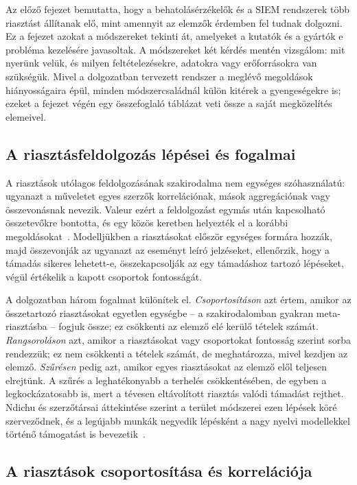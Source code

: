 Az előző fejezet bemutatta, hogy a behatolásérzékelők és a \ac{SIEM} rendszerek több riasztást állítanak elő, mint amennyit az elemzők érdemben fel tudnak dolgozni. Ez a fejezet azokat a módszereket tekinti át, amelyeket a kutatók és a gyártók e probléma kezelésére javasoltak. A módszereket két kérdés mentén vizsgálom: mit nyerünk velük, és milyen feltételezésekre, adatokra vagy erőforrásokra van szükségük. Mivel a dolgozatban tervezett rendszer a meglévő megoldások hiányosságaira épül, minden módszercsaládnál külön kitérek a gyengeségekre is; ezeket a fejezet végén egy összefoglaló táblázat veti össze a saját megközelítés elemeivel.

\subsection{A riasztásfeldolgozás lépései és fogalmai}\label{sec:lepesek}
A riasztások utólagos feldolgozásának szakirodalma nem egységes szóhasználatú: ugyanazt a műveletet egyes szerzők korrelációnak, mások aggregációnak vagy összevonásnak nevezik. Valeur ezért a feldolgozást egymás után kapcsolható összetevőkre bontotta, és egy közös keretben helyezték el a korábbi megoldásokat~\cite{valeur2004}. Modelljükben a riasztásokat először egységes formára hozzák, majd összevonják az ugyanazt az eseményt leíró jelzéseket, ellenőrzik, hogy a támadás sikeres lehetett-e, összekapcsolják az egy támadáshoz tartozó lépéseket, végül értékelik a kapott csoportok fontosságát.

A dolgozatban három fogalmat különítek el. \emph{Csoportosításon} azt értem, amikor az összetartozó riasztásokat egyetlen egységbe -- a szakirodalomban gyakran meta-riasztásba -- fogjuk össze; ez csökkenti az elemző elé kerülő tételek számát. \emph{Rangsoroláson} azt, amikor a riasztásokat vagy csoportokat fontosság szerint sorba rendezzük; ez nem csökkenti a tételek számát, de meghatározza, mivel kezdjen az elemző. \emph{Szűrésen} pedig azt, amikor egyes riasztásokat az elemző elől teljesen elrejtünk. A szűrés a leghatékonyabb a terhelés csökkentésében, de egyben a legkockázatosabb is, mert a tévesen eltávolított riasztás valódi támadást rejthet. Ndichu és szerzőtársai áttekintése szerint a terület módszerei ezen lépések köré szerveződnek, és a legújabb munkák negyedik lépésként a nagy nyelvi modellekkel történő támogatást is bevezetik~\cite{ndichu2026}.

\subsection{A riasztások csoportosítása és korrelációja}\label{sec:csoportositas}

